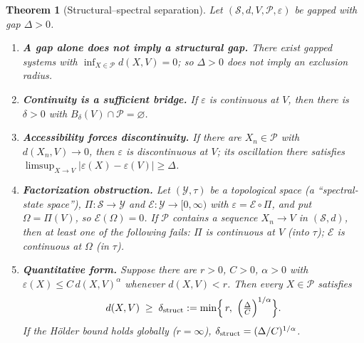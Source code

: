 \documentclass[11pt,a4paper]{article}
\newtheorem{theorem}{Theorem}
\theoremstyle{definition}
\theoremstyle{remark}
\newcommand{\Pset}{\mathcal{P}}
\begin{document}
\begin{theorem}[Structural--spectral separation]\label{thm:sep}
Let $(\mathcal S,d,V,\Pset,\varepsilon)$ be gapped with gap $\Delta>0$.
\begin{enumerate}[label=(\alph*)]
\item \textbf{A gap alone does not imply a structural gap.} There exist gapped systems with $\inf_{X\in\Pset}d(X,V)=0$; so $\Delta>0$ does not imply an exclusion radius.
\item \textbf{Continuity is a sufficient bridge.} If $\varepsilon$ is continuous at $V$, then there is $\delta>0$ with $B_\delta(V)\cap\Pset=\varnothing$.
\item \textbf{Accessibility forces discontinuity.} If there are $X_n\in\Pset$ with $d(X_n,V)\to0$, then $\varepsilon$ is discontinuous at $V$; its oscillation there satisfies $\limsup_{X\to V}|\varepsilon(X)-\varepsilon(V)|\ge\Delta$.
\item \textbf{Factorization obstruction.} Let $(\mathcal Y,\tau)$ be a topological space (a ``spectral-state space''), $\Pi:\mathcal S\to\mathcal Y$ and $\mathcal E:\mathcal Y\to[0,\infty)$ with $\varepsilon=\mathcal E\circ\Pi$, and put $\Omega=\Pi(V)$, so $\mathcal E(\Omega)=0$. If $\Pset$ contains a sequence $X_n\to V$ in $(\mathcal S,d)$, then at least one of the following fails: $\Pi$ is continuous at $V$ (into $\tau$); $\mathcal E$ is continuous at $\Omega$ (in $\tau$).
\item \textbf{Quantitative form.} Suppose there are $r>0$, $C>0$, $\alpha>0$ with $\varepsilon(X)\le C\,d(X,V)^\alpha$ whenever $d(X,V)<r$. Then every $X\in\Pset$ satisfies
\begin{equation}\label{eq:holder}
d(X,V)\;\ge\;\delta_{\rm struct}:=\min\!\Big\{\,r,\ \Big(\tfrac{\Delta}{C}\Big)^{1/\alpha}\Big\}.
\end{equation}
If the Hölder bound holds globally ($r=\infty$), $\delta_{\rm struct}=(\Delta/C)^{1/\alpha}$.
\end{enumerate}
\end{theorem}
\end{document}
